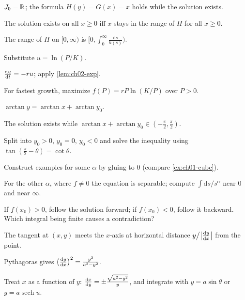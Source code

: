 \begin{hintlevels}
  \item $J_0 = \mathbb{R}$; the formula $H(y) = G(x) = x$ holds while the solution
        exists.
  \item The solution exists on all $x\ge 0$ iff $x$ stays in the range of $H$
        for all $x\ge0$.
  \item The range of $H$ on $[0,\infty)$ is $[0,\int_0^\infty\frac{\mathrm{d}s}{h(s)})$.
\end{hintlevels}

\begin{hintlevels}
  \item Substitute $u = \ln(P/K)$.
  \item $\frac{\mathrm{d}u}{\mathrm{d}t} = -ru$; apply \cref{lem:ch02-exp}.
  \item For fastest growth, maximize $f(P) = rP\ln(K/P)$ over $P>0$.
\end{hintlevels}

\begin{hintlevels}
  \item $\arctan y = \arctan x + \arctan y_0$.
  \item The solution exists while $\arctan x + \arctan y_0\in(-\frac\pi2,\frac\pi2)$.
  \item Split into $y_0>0$, $y_0 = 0$, $y_0<0$ and solve the inequality using
        $\tan(\frac\pi2 - \theta) = \cot\theta$.
\end{hintlevels}

\begin{hintlevels}
  \item Construct examples for some $\alpha$ by gluing to $0$ (compare
        \cref{ex:ch01-cube}).
  \item For the other $\alpha$, where $f\neq0$ the equation is separable;
        compute $\int\mathrm{d}s/s^\alpha$ near $0$ and near $\infty$.
  \item If $f(x_0)>0$, follow the solution forward; if $f(x_0)<0$, follow it
        backward. Which integral being finite causes a contradiction?
\end{hintlevels}

\begin{hintlevels}
  \item The tangent at $(x,y)$ meets the $x$-axis at horizontal distance
        $y\big/\bigl|\frac{\mathrm{d}y}{\mathrm{d}x}\bigr|$ from the point.
  \item Pythagoras gives $\bigl(\frac{\mathrm{d}y}{\mathrm{d}x}\bigr)^2 = \frac{y^2}{a^2 - y^2}$.
  \item Treat $x$ as a function of $y$: $\frac{\mathrm{d}x}{\mathrm{d}y} = \pm\frac{\sqrt{a^2-y^2}}{y}$,
        and integrate with $y = a\sin\theta$ or $y = a\operatorname{sech}u$.
\end{hintlevels}

